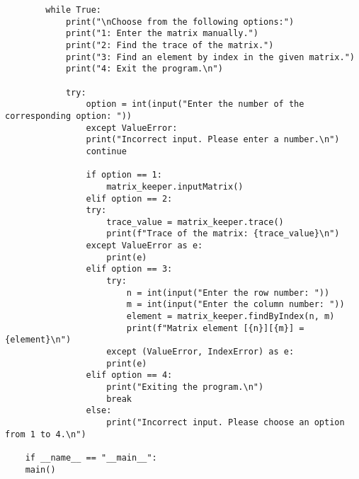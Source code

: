 \begin{lstlisting}
		while True:
			print("\nChoose from the following options:")
			print("1: Enter the matrix manually.")
			print("2: Find the trace of the matrix.")
			print("3: Find an element by index in the given matrix.")
			print("4: Exit the program.\n")
			
			try:
				option = int(input("Enter the number of the corresponding option: "))
				except ValueError:
				print("Incorrect input. Please enter a number.\n")
				continue
				
				if option == 1:
					matrix_keeper.inputMatrix()
				elif option == 2:
				try:
					trace_value = matrix_keeper.trace()
					print(f"Trace of the matrix: {trace_value}\n")
				except ValueError as e:
					print(e)
				elif option == 3:
					try:
						n = int(input("Enter the row number: "))
						m = int(input("Enter the column number: "))
						element = matrix_keeper.findByIndex(n, m)
						print(f"Matrix element [{n}][{m}] = {element}\n")
					except (ValueError, IndexError) as e:
					print(e)
				elif option == 4:
					print("Exiting the program.\n")
					break
				else:
					print("Incorrect input. Please choose an option from 1 to 4.\n")
	
	if __name__ == "__main__":
	main()
	
\end{lstlisting}

